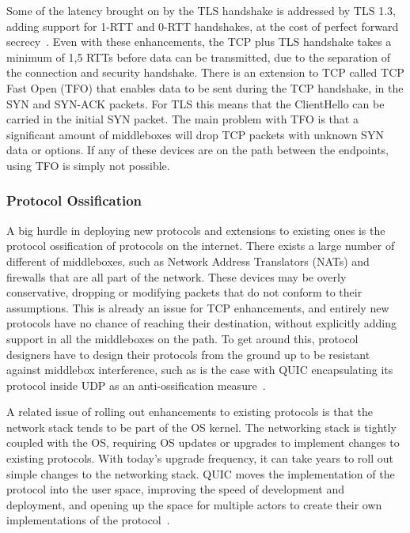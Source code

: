 \documentclass[english, 12pt, a4paper, elec, utf8, a-2b, online]{aaltothesis}
\begin{document}
Some of the latency brought on by the TLS handshake is addressed by TLS 1.3, adding
support for 1-RTT and 0-RTT handshakes, at the cost of perfect forward secrecy~\cite{rfc8446}. Even with
these enhancements, the TCP plus TLS handshake takes a minimum of 1,5 RTTs before data can be
transmitted, due to the separation of the connection and security handshake. There is
an extension to TCP called TCP Fast Open (TFO) that enables data to be sent during
the TCP handshake, in the SYN and SYN-ACK packets. For TLS this means that
the ClientHello can be carried in the initial SYN packet\cite{rfc7413}. The main problem
with TFO is that a significant amount of middleboxes will drop TCP packets with
unknown SYN data or options. If any of these devices are on the path between the
endpoints, using TFO is simply not possible\cite{fast_open_problem}.

\subsubsection{Protocol Ossification}
A big hurdle in deploying new protocols and extensions to existing ones
is the protocol ossification of protocols on the internet. There exists a large number of different
of middleboxes, such as Network Address Translators (NATs) and firewalls that are all
part of the network. These devices may be overly conservative, dropping or 
modifying packets that do not conform to their assumptions. This is already an
issue for TCP enhancements, and entirely new protocols have no chance of reaching
their destination, without explicitly adding support in all the middleboxes on the path.
To get around this, protocol designers have to design their protocols from the ground
up to be resistant against middlebox interference, such as is the case with QUIC encapsulating
its protocol inside UDP as an anti-ossification measure~\cite{Ossification}.

A related issue of rolling out enhancements to existing protocols is that the
network stack tends to be part of the OS kernel. The networking
stack is tightly coupled with the OS, requiring OS updates or upgrades to implement
changes to existing protocols. With today's upgrade frequency, it can take years
to roll out simple changes to the networking stack. QUIC moves the implementation of the 
protocol into the user space, improving the speed of development and deployment,
and opening up the space for multiple actors to create their own implementations of
the protocol~\cite{quic_transport_protocol_design}.
\end{document}
